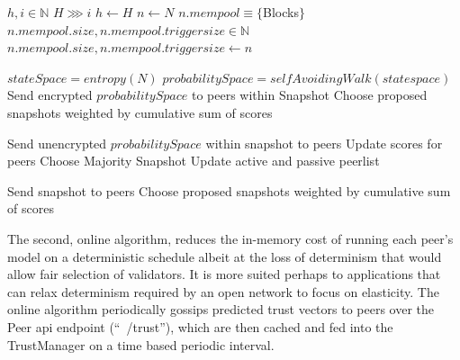 \documentclass{article}
\theoremstyle{definition}
\theoremstyle{remark}
\theoremstyle{plain}
\begin{document}
\begin{algorithm}
\caption{Batch Algorithm (permissionless): Entropy Rate (Optimal for node rewards/cycling between active and passive nodes)}\label{alg:cap}
\begin{algorithmic}
\State $h, i \in \mathbb{N}$
\State $H \ggg  i$
\State $h \gets H$
\State $n \gets N$ 
\State $n.mempool \equiv \{ $Blocks$ \}$
\State $n.mempool.size, n.mempool.triggersize \in \mathbb{N}$
\State  $n.mempool.size, n.mempool.triggersize \gets n$ 

    		\State $stateSpace = entropy(N)$ 
   	 	\State $probabilitySpace = selfAvoidingWalk (state space)$  
   	 	\State Send encrypted $probabilitySpace$ to peers within Snapshot
    		\State Choose proposed snapshots weighted by cumulative sum of scores

    			\State Send unencrypted $probabilitySpace$ within snapshot to peers
   				 	\State Update scores for peers
					 \State Choose Majority Snapshot
					 \State Update active and passive peerlist
				\EndFor
			\EndIf
		
		
	    		\State Send snapshot to peers
	    		\State Choose proposed snapshots weighted by cumulative sum of scores
		
		
	\EndIf
\EndFor
\end{algorithmic}
\end{algorithm}

The second, online algorithm, reduces the in-memory cost of running each peer’s model on a deterministic schedule albeit at the loss of determinism that would allow fair selection of validators. It is more suited perhaps to applications that can relax determinism required by an open network to focus on elasticity. The online algorithm periodically gossips predicted trust vectors to peers over the Peer api endpoint (“~/trust”), which are then cached and fed into the TrustManager on a time based periodic interval.
\end{document}
